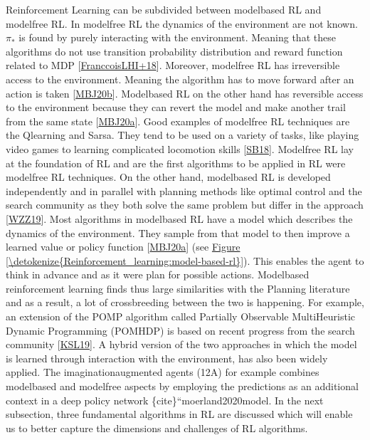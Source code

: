 \documentclass[letterpaper,10pt,english]{jupyterBook}
\begin{document}
\sphinxAtStartPar
Reinforcement Learning can be subdivided between model\sphinxhyphen{}based RL and model\sphinxhyphen{}free RL. In model\sphinxhyphen{}free RL the dynamics of the environment are not known. \(\pi_*\) is found by purely interacting with the environment. Meaning that these algorithms do not use transition probability distribution and reward function related to MDP {[}\hyperlink{cite.Discussion:id72}{FranccoisLHI+18}{]}. Moreover, model\sphinxhyphen{}free RL has irreversible access to the environment. Meaning the algorithm has to move forward after an action is taken {[}\hyperlink{cite.Discussion:id71}{MBJ20b}{]}. Model\sphinxhyphen{}based RL on the other hand has reversible access to the environment because they can revert the model and make another trail from the same state {[}\hyperlink{cite.Discussion:id7}{MBJ20a}{]}. Good examples of model\sphinxhyphen{}free RL techniques are the Q\sphinxhyphen{}learning and Sarsa. They tend to be used on a variety of tasks, like playing video games to learning complicated locomotion skills {[}\hyperlink{cite.Discussion:id70}{SB18}{]}. Model\sphinxhyphen{}free RL lay at the foundation of RL and are the first algorithms to be applied in RL were model\sphinxhyphen{}free RL techniques. On the other hand, model\sphinxhyphen{}based RL is developed independently and in parallel with planning methods like optimal control and the search community as they both solve the same problem but differ in the approach {[}\hyperlink{cite.Discussion:id38}{WZZ19}{]}. Most algorithms in model\sphinxhyphen{}based RL have a model which describes the dynamics of the environment. They sample from that model to then improve a learned value or policy function {[}\hyperlink{cite.Discussion:id7}{MBJ20a}{]} (see \hyperref[\detokenize{Reinforcement_learning:model-based-rl}]{Figure \ref{\detokenize{Reinforcement_learning:model-based-rl}}}). This enables the agent to think in advance and as it were plan for possible actions. Model\sphinxhyphen{}based reinforcement learning finds thus large similarities with the Planning literature and as a result, a lot of cross\sphinxhyphen{}breeding between the two is happening. For example, an extension of the POMP algorithm called Partially Observable Multi\sphinxhyphen{}Heuristic Dynamic Programming (POMHDP) is based on recent progress from the search community {[}\hyperlink{cite.Discussion:id10}{KSL19}{]}. A hybrid version of the two approaches in which the model is learned through interaction with the environment, has also been widely applied. The imagination\sphinxhyphen{}augmented agents (12A) for example combines model\sphinxhyphen{}based and model\sphinxhyphen{}free aspects by employing the predictions as an additional context in a deep policy network \{cite\}``moerland2020model.  In the next subsection, three fundamental algorithms in RL are discussed which will enable us to better capture the dimensions and challenges of RL algorithms.
\end{document}
